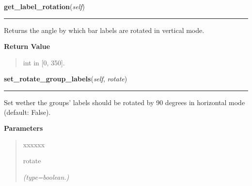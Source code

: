     \label{pygtk_chart:multi_bar_chart:MultiBarChart:get_label_rotation}

    \vspace{0.5ex}

\hspace{.8\funcindent}\begin{boxedminipage}{\funcwidth}

    \raggedright \textbf{get\_label\_rotation}(\textit{self})

    \vspace{-1.5ex}

    \rule{\textwidth}{0.5\fboxrule}
\setlength{\parskip}{2ex}
    Returns the angle by which bar labels are rotated in vertical mode.

\setlength{\parskip}{1ex}
      \textbf{Return Value}
    \vspace{-1ex}

      \begin{quote}
      int in [0, 350].

      \end{quote}

    \end{boxedminipage}

    \label{pygtk_chart:multi_bar_chart:MultiBarChart:set_rotate_group_labels}

    \vspace{0.5ex}

\hspace{.8\funcindent}\begin{boxedminipage}{\funcwidth}

    \raggedright \textbf{set\_rotate\_group\_labels}(\textit{self}, \textit{rotate})

    \vspace{-1.5ex}

    \rule{\textwidth}{0.5\fboxrule}
\setlength{\parskip}{2ex}
    Set wether the groups' labels should be rotated by 90 degrees in 
    horizontal mode (default: False).

\setlength{\parskip}{1ex}
      \textbf{Parameters}
      \vspace{-1ex}

      \begin{quote}
        \begin{Ventry}{xxxxxx}

          \item[rotate]

            {\it (type=boolean.)}

        \end{Ventry}

      \end{quote}

    \end{boxedminipage}


